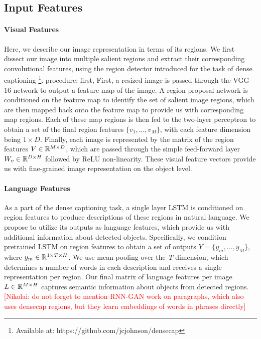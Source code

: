 \documentclass[11pt,a4paper]{article}
\newcommand{\kibitz}[2]{\ifnum\Comments=1\textcolor{#1}{#2}\fi}
\newcommand{\nikolai}[1]{\kibitz{red}      {[Nikolai: #1]}}
\newcommand{\R}{\mathbb{R}}
\begin{document}
\subsection{Input Features}

\paragraph{Visual Features} Here, we describe our image representation in terms of its regions.
We first dissect our image into multiple salient regions and extract their corresponding convolutional features, using the region detector introduced for the task of dense captioning \cite{densecap}\footnote{Available at: https://github.com/jcjohnson/densecap}.
procedure: first,
First, a resized image is passed through the VGG-16 network \cite{Simonyan2014} to output a feature map of the image.
A region proposal network is conditioned on the feature map to identify the set of salient image regions, which are then mapped back onto the feature map to provide us with corresponding map regions.
Each of these map regions is then fed to the two-layer perceptron to obtain a set of the final region features ${\{v_1, ..., v_M\}}$, with each feature dimension being ${1 \times D}$.
Finally, each image is represented by the matrix of the region features $V \in \R\sp{M \times D}$, which are passed through the simple feed-forward layer $W_v \in \R\sp{D \times H}$ followed by ReLU non-linearity.
These visual feature vectors provide us with fine-grained image representation on the object level.

\paragraph{Language Features} As a part of the dense captioning task, a single layer LSTM \cite{lstm97} is conditioned on region features to produce descriptions of these regions in natural language.
We propose to utilize its outputs as language features, which provide us with additional information about detected objects.
Specifically, we condition pretrained LSTM on region features to obtain a set of outputs ${Y = \{y_m, ..., y_M\}}$, where $y_m \in \R\sp{1 \times T \times H}$.
We use mean pooling over the \textit{T} dimension, which determines a number of words in each description and receives a single representation per region. %
Our final matrix of language features per image $L \in \R\sp{M \times H}$ captures semantic information about objects from detected regions. %
\nikolai{do not forget to mention RNN-GAN work on paragraphs, which also uses densecap regions, but they learn embeddings of words in phrases directly}
\end{document}
